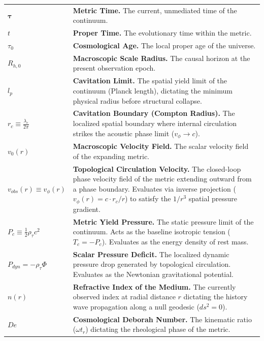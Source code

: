 \begin{tcolorbox}[colback=white, colframe=academiabrown!90!black, arc=1mm, boxrule=0.8pt, title={\textbf{TABLE 1: KINEMATIC NOMENCLATURE \& METRIC CONSTANTS}}]
\renewcommand{\arraystretch}{1.4}
\begin{tabular}{p{} p{}}
    $\boldsymbol{\tau}$ & \textbf{Metric Time.} The current, unmediated time of the continuum. \\
    $t$ & \textbf{Proper Time.} The evolutionary time within the metric. \\
    $\tau_0$ & \textbf{Cosmological Age.} The local proper age of the universe. \\
    $R_{h,0}$ & \textbf{Macroscopic Scale Radius.} The causal horizon at the present observation epoch. \\
    $l_p$ & \textbf{Cavitation Limit.} The spatial yield limit of the continuum (Planck length), dictating the minimum physical radius before structural collapse. \\ 
    $r_c \equiv \frac{\lambda_c}{2\pi}$ & \textbf{Cavitation Boundary (Compton Radius).} The localized spatial boundary where internal circulation strikes the acoustic phase limit ($v_\phi \to c$). \\ 
    $v_0(r)$ & \textbf{Macroscopic Velocity Field.} The scalar velocity field of the expanding metric. \\ 
    $v_{obs}(r) \equiv v_\phi(r)$ & \textbf{Topological Circulation Velocity.} The closed-loop phase velocity field of the metric extending outward from a phase boundary. Evaluates via inverse projection ($v_\phi(r) = c \cdot{r_c/r}$) to satisfy the $1/r^3$ spatial pressure gradient. \\ 
    $P_c \equiv \frac{1}{2}\rho_{\tau}c^2$ & \textbf{Metric Yield Pressure.} The static pressure limit of the continuum. Acts as the baseline isotropic tension ($T_c = -P_c$). Evaluates as the energy density of rest mass. \\ 
    $P_{dyn} = -\rho_{\tau} \Phi$ & \textbf{Scalar Pressure Deficit.} The localized dynamic pressure drop generated by topological circulation. Evaluates as the Newtonian gravitational potential. \\  
    $n(r)$ & \textbf{Refractive Index of the Medium.} The currently observed index at radial distance $r$ dictating the history wave propagation along a null geodesic ($ds^2 = 0$). \\
    $De$ & \textbf{Cosmological Deborah Number.} The kinematic ratio ($\omega t_r$) dictating the rheological phase of the metric. \\

\end{tabular}
\end{tcolorbox}
